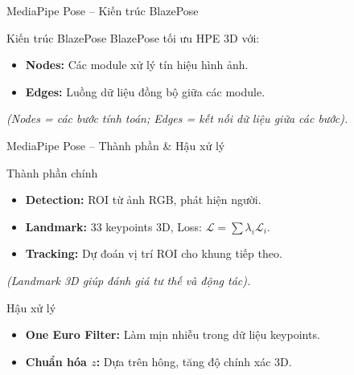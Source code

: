 \begin{frame}{MediaPipe Pose – Kiến trúc BlazePose}
    \begin{block}{Kiến trúc BlazePose}
        BlazePose tối ưu HPE 3D với:
        \begin{itemize}
            \item \textbf{Nodes:} Các module xử lý tín hiệu hình ảnh.
            \item \textbf{Edges:} Luồng dữ liệu đồng bộ giữa các module.
        \end{itemize}
        \small{\textit{(Nodes = các bước tính toán; Edges = kết nối dữ liệu giữa các bước).}}
    \end{block}
\end{frame}

\begin{frame}{MediaPipe Pose – Thành phần & Hậu xử lý}
    \begin{exampleblock}{Thành phần chính}
        \begin{itemize}
            \item \textbf{Detection:} ROI từ ảnh RGB, phát hiện người.
            \item \textbf{Landmark:} 33 keypoints 3D, Loss: $\mathcal{L} = \sum \lambda_i \mathcal{L}_i$.
            \item \textbf{Tracking:} Dự đoán vị trí ROI cho khung tiếp theo.
        \end{itemize}
        \small{\textit{(Landmark 3D giúp đánh giá tư thế và động tác).}}
    \end{exampleblock}

    \begin{alertblock}{Hậu xử lý}
        \begin{itemize}
            \item \textbf{One Euro Filter:} Làm mịn nhiễu trong dữ liệu keypoints.
            \item \textbf{Chuẩn hóa $z$:} Dựa trên hông, tăng độ chính xác 3D.
        \end{itemize}
    \end{alertblock}
\end{frame}


